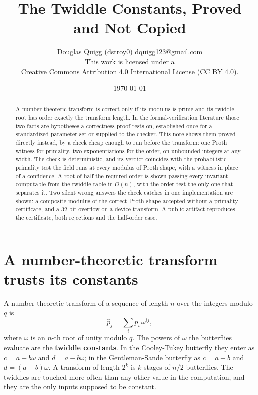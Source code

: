 \documentclass{article}
\title{The Twiddle Constants, Proved and Not Copied}
\author{Douglas Quigg (dstroy0) \small dquigg123@gmail.com \\
\small This work is licensed under a \\
\small Creative Commons Attribution 4.0 International License (CC BY 4.0).
\small \date{\today}}
\begin{document}
\maketitle

\begin{abstract}
A number-theoretic transform is correct only if its modulus is prime and its twiddle root has order exactly the transform length. In the formal-verification literature those two facts are hypotheses a correctness proof rests on, established once for a standardized parameter set or supplied to the checker. This note shows them proved directly instead, by a check cheap enough to run before the transform: one Proth witness for primality, two exponentiations for the order, on unbounded integers at any width. The check is deterministic, and its verdict coincides with the probabilistic primality test the field runs at every modulus of Proth shape, with a witness in place of a confidence. A root of half the required order is shown passing every invariant computable from the twiddle table in \(O(n)\), with the order test the only one that separates it. Two silent wrong answers the check catches in one implementation are shown: a composite modulus of the correct Proth shape accepted without a primality certificate, and a 32-bit overflow on a device transform. A public artifact reproduces the certificate, both rejections and the half-order case.
\end{abstract}

\section{A number-theoretic transform trusts its constants}

A number-theoretic transform of a sequence of length \(n\) over the integers modulo \(q\) is
\[
\hat{p}_j = \sum_i p_i \, \omega^{ij},
\]
where \(\omega\) is an \(n\)-th root of unity modulo \(q\). The powers of \(\omega\) the butterflies evaluate are the \textbf{twiddle constants}. In the Cooley-Tukey butterfly they enter as \(c = a + b\omega\) and \(d = a - b\omega\); in the Gentleman-Sande butterfly as \(c = a + b\) and \(d = (a-b)\omega\). A transform of length \(2^k\) is \(k\) stages of \(n/2\) butterflies. The twiddles are touched more often than any other value in the computation, and they are the only inputs supposed to be constant.
\end{document}
